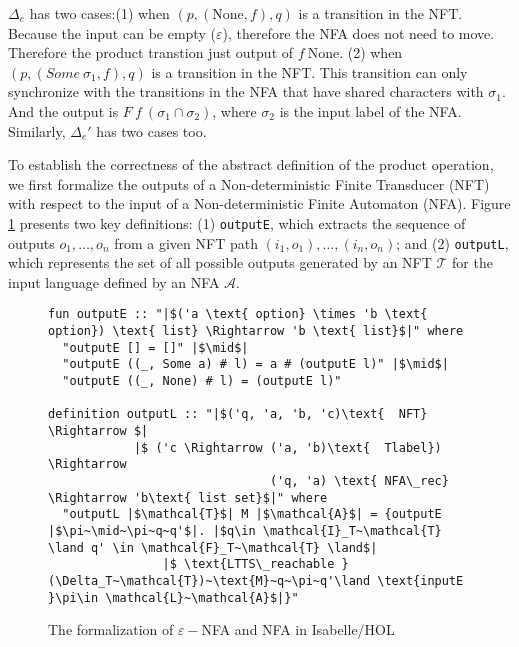 \documentclass[a4paper,UKenglish,cleveref, autoref, anonymous, thm-restate]{lipics-v2021}
\begin{document}
$\Delta_e$ has two cases:(1) when $(p, (\text{None}, f),  q)$ is a transition in the NFT. Because the input can be empty ($\varepsilon$), therefore the NFA does not need to move. Therefore the product transtion just output of $f~\text{None}$. (2) when $(p, (Some~\sigma_1, f), q)$ is a transition in the NFT. This transition can only synchronize with the transitions in the NFA that have shared characters with $\sigma_1$. And the output is $F~f~(\sigma_1\cap\sigma_2)$, where $\sigma_2$ is the input label of the NFA. Similarly, $\Delta_e'$ has two cases too.


To establish the correctness of the abstract definition of the product operation, we first formalize the outputs of a Non-deterministic Finite Transducer (NFT) with respect to the input of a Non-deterministic Finite Automaton (NFA). Figure \ref{fig-def-output} presents two key definitions: (1) \texttt{outputE}, which extracts the sequence of outputs $o_1, \ldots, o_n$ from a given NFT path $(i_1, o_1), \ldots, (i_n, o_n)$; and (2) \texttt{outputL}, which represents the set of all possible outputs generated by an NFT $\mathcal{T}$ for the input language defined by an NFA $\mathcal{A}$.


\begin{figure}[hbt!]
	\begin{lstlisting}
fun outputE :: "|$('a \text{ option} \times 'b \text{ option}) \text{ list} \Rightarrow 'b \text{ list}$|" where
  "outputE [] = []" |$\mid$|
  "outputE ((_, Some a) # l) = a # (outputE l)" |$\mid$|
  "outputE ((_, None) # l) = (outputE l)"

definition outputL :: "|$('q, 'a, 'b, 'c)\text{  NFT} \Rightarrow $|
            |$ ('c \Rightarrow ('a, 'b)\text{  Tlabel}) \Rightarrow 
                               ('q, 'a) \text{ NFA\_rec} \Rightarrow 'b\text{ list set}$|" where
  "outputL |$\mathcal{T}$| M |$\mathcal{A}$| = {outputE |$\pi~\mid~\pi~q~q'$|. |$q\in \mathcal{I}_T~\mathcal{T} \land q' \in \mathcal{F}_T~\mathcal{T} \land$|
                |$ \text{LTTS\_reachable }(\Delta_T~\mathcal{T})~\text{M}~q~\pi~q'\land \text{inputE }\pi\in \mathcal{L}~\mathcal{A}$|}" 
	\end{lstlisting}
\caption{The formalization of $\varepsilon-$NFA and NFA in Isabelle/HOL}
\label{fig-def-output}
\end{figure}
\end{document}
